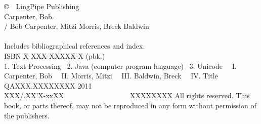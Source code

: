 \clearpage
\pagestyle{empty}
\vspace*{1.25in}
\noindent
{\footnotesize%
\copyright \ \ LingPipe Publishing
\hfill
\vfill
\vfill
{}
\\[6pt]
Carpenter, Bob.
\\
\hspace*{0.125in}{\it Text Processing with Java 6} / Bob
Carpenter, Mitzi Morris, Breck Baldwin
\\
\hspace*{.5in}{p. cm.}
\\
\hspace*{0.125in}Includes bibliographical references and index.
\\
\hspace*{0.125in}ISBN X-XXX-XXXXX-X (pbk.)
\\[4pt]
1. Text Processing  \ 2. Java (computer program language) \ 3. Unicode
\ \ I. Carpenter, Bob \ \ II. Morris, Mitzi \ \ III. Baldwin, Breck \ \ IV. Title
\\[2pt]
\hspace*{0.125in}QAXXX.XXXXXXXX 2011
\\[2pt]
\hspace*{0.125in}XXX/.XX'X-xxXX      \ \ \ \ \ \ \ \ \ \ \ \ \ \ \ \ \  \ XXXXXXXX
\vfill
All rights reserved. This book, or parts thereof, may not
be reproduced in any form without permission of the publishers.
}

